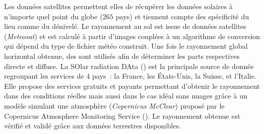Les données satellites permettent elles de récupérer les données solaires à n’importe quel
point du globe ($265$ pays) et tiennent compte des spécificité du lieu comme du dénivelé.
Le rayonnement au sol est issue de données satellites (\textit{Meteosat}) et est
calculé à partir d’images couplées à un algorithme de conversion qui dépend du type de
fichier météo construit. Une fois le rayonnement global horizontal obtenue, des
sont utilisés afin de déterminer les parts respectives directe et diffuse. La SOlar
radiation DAta () est la principale source de
donnée regroupant les services de 4 pays~: la France, les États-Unis, la Suisse, et
l’Italie. Elle propose des services gratuits et payants permettant d’obtenir le
rayonnement dans des conditions réelles mais aussi dans le cas idéal sans nuages grâce à
un modèle simulant une atmosphère (\textit{Copernicus McClear}) proposé par le
Copernicus Atmosphere Monitoring Service ().
Le rayonnement obtenue est vérifié et validé grâce aux données terrestres disponibles.

